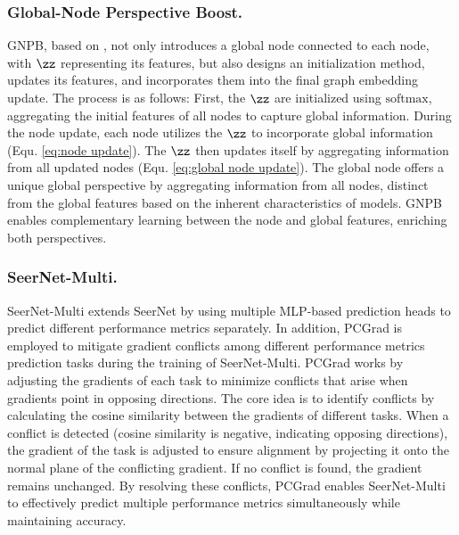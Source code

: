 \subsubsection{Global-Node Perspective Boost.}\label{sec:gnpb}
GNPB, based on \cite{virtualnode}, not only introduces a global node connected to each node, with $\zz$ representing its features, but also designs an initialization method, updates its features, and incorporates them into the final graph embedding update.
The process is as follows:
First, the $\zz$ are initialized using ${\text{softmax}}$, aggregating the initial features of all nodes to capture global information.  
During the node update, each node utilizes the $\zz$ to incorporate global information (Equ. \ref{eq:node update}).  
The $\zz$ then updates itself by aggregating information from all updated nodes (Equ. \ref{eq:global node update}).
The global node offers a unique global perspective by aggregating information from all nodes, distinct from the global features based on the inherent characteristics of models. GNPB enables complementary learning between the node and global features, enriching both perspectives.

\subsubsection{SeerNet-Multi.}\label{sec:seernet multi}
SeerNet-Multi extends SeerNet by using multiple MLP-based prediction heads to predict different performance metrics separately.
In addition, PCGrad is employed to mitigate gradient conflicts among different performance metrics prediction tasks during the training of SeerNet-Multi. PCGrad works by adjusting the gradients of each task to minimize conflicts that arise when gradients point in opposing directions.
The core idea is to identify conflicts by calculating the cosine similarity between the gradients of different tasks. When a conflict is detected (cosine similarity is negative, indicating opposing directions), the gradient of the task is adjusted to ensure alignment by projecting it onto the normal plane of the conflicting gradient. If no conflict is found, the gradient remains unchanged.
By resolving these conflicts, PCGrad enables SeerNet-Multi to effectively predict multiple performance metrics simultaneously while maintaining accuracy.
